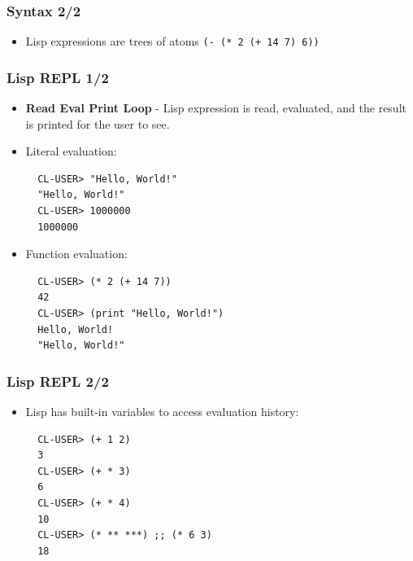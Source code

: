 \documentclass{beamer}
\begin{document}
\begin{frame}[fragile]
  \frametitle{Syntax 2/2}
  \begin{itemize}
  \item Lisp expressions are trees of atoms \texttt{(- (* 2 (+ 14 7) 6))}
    \begin{center}
    \end{center}
  \end{itemize}
\end{frame}

\begin{frame}[fragile]
  \frametitle{Lisp REPL 1/2}
  \begin{itemize}
  \item \textbf{Read Eval Print Loop} - Lisp expression is read, evaluated, and
    the result is printed for the user to see. 
  \item Literal evaluation:
\begin{verbatim}
  CL-USER> "Hello, World!"
  "Hello, World!"
  CL-USER> 1000000
  1000000
\end{verbatim}
  \item Function evaluation:
\begin{verbatim}
  CL-USER> (* 2 (+ 14 7))
  42
  CL-USER> (print "Hello, World!")
  Hello, World!
  "Hello, World!"
\end{verbatim}
  \end{itemize}
\end{frame}

\begin{frame}[fragile]
  \frametitle{Lisp REPL 2/2}
  \begin{itemize}
  \item Lisp has built-in variables to access evaluation history:
\begin{verbatim}
  CL-USER> (+ 1 2)
  3
  CL-USER> (+ * 3)
  6
  CL-USER> (+ * 4)
  10
  CL-USER> (* ** ***) ;; (* 6 3)
  18
\end{verbatim}    
  \end{itemize}
\end{frame}
\end{document}

